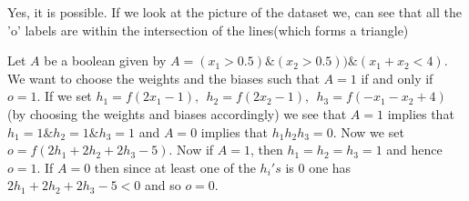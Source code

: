 \begin{answer}
  Yes, it is possible. If we look at the picture of the dataset we, can see that all the 'o' labels are within the intersection of the lines(which forms a triangle)
 
Let $A$ be a boolean given by $A = (x_1 > 0.5) \& (x_2 > 0.5))\& (x_1 + x_2 < 4).$
We want to choose the weights and the biases such that $A = 1$ if and only if $o = 1.$
If we set $h _1 = f(2x_1 - 1),\ \ h_2 = f(2x_2 - 1),\ \  h_3 = f(-x_1 - x_2 + 4)$ (by choosing the weights and biases accordingly)
we see that $A = 1$ implies that $h_1 = 1 \& h_2 = 1 \& h_3 = 1$ and $A = 0$ implies that $h_1h_2h_3 = 0.$
Now we set $o = f(2h_1 + 2h_2 + 2h_3 - 5).$ Now if $A = 1$, then $h_1 = h_2 = h_3 = 1$ and hence $o = 1.$
If $A = 0$ then since at least one of the $h_i's$ is 0  one has $2h_1 + 2h_2 + 2h_3 - 5 < 0$ and so $o = 0.$ 


 \end{answer}
